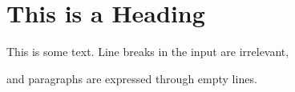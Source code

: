 \documentclass{scrartcl}
\begin{document}
\section{This is a Heading}

This is some text.
Line breaks in the input are irrelevant,

and paragraphs are expressed through empty lines.

\Blindtext[1]
\end{document}
